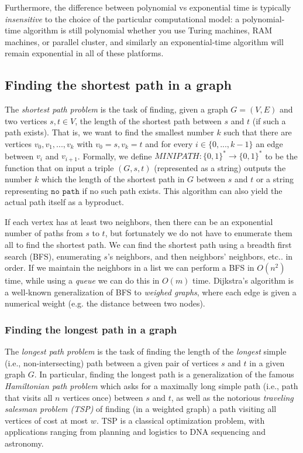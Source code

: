 \documentclass{article}
\begin{document}
  Furthermore, the difference between polynomial vs exponential time is typically \textit{insensitive} to the choice of the particular computational model: a polynomial-time algorithm is still polynomial whether you use Turing machines, RAM machines, or parallel cluster, and similarly an exponential-time algorithm will remain exponential in all of these platforms. 

  \subsection{Finding the shortest path in a graph}
  The \textit{shortest path problem} is the task of finding, given a graph $G = (V, E)$ and two vertices $s, t \in V$, the length of the shortest path between $s$ and $t$ (if such a path exists). That is, we want to find the smallest number $k$ such that there are vertices $v_0, v_1, ..., v_k$ with $v_0 = s, v_k = t$ and for every $i \in \{0,..., k-1\}$ an edge between $v_i$ and $v_{i+1}$. Formally, we define $MINIPATH: \{0,1\}^* \longrightarrow \{0,1\}^*$ to be the function that on input a triple $(G, s, t)$ (represented as a string) outputs the number $k$ which the length of the shortest path in $G$ between $s$ and $t$ or a string representing $\texttt{no path}$ if no such path exists. This algorithm can also yield the actual path itself as a byproduct. 

  If each vertex has at least two neighbors, then there can be an exponential number of paths from $s$ to $t$, but fortunately we do not have to enumerate them all to find the shortest path. We can find the shortest path using a breadth first search (BFS), enumerating $s$’s neighbors, and then neighbors’ neighbors, etc.. in order. If we maintain the neighbors in a list we can perform a BFS in $O(n^2)$ time, while using a \textit{queue} we can do this in $O(m)$ time. Dijkstra’s algorithm is a well-known generalization of BFS to \textit{weighed graphs}, where each edge is given a numerical weight (e.g. the distance between two nodes). 

  \subsubsection{Finding the longest path in a graph}
  The \textit{longest path problem} is the task of finding the length of the \textit{longest} simple (i.e., non-intersecting) path between a given pair of vertices $s$ and $t$ in a given graph $G$. In particular, finding the longest path is a generalization of the famous \textit{Hamiltonian path problem} which asks for a maximally long simple path (i.e., path that visits all $n$ vertices once) between $s$ and $t$, as well as the notorious \textit{traveling salesman problem (TSP)} of finding (in a weighted graph) a path visiting all vertices of cost at most $w$. TSP is a classical optimization problem, with applications ranging from planning and logistics to DNA sequencing and astronomy.
\end{document}

